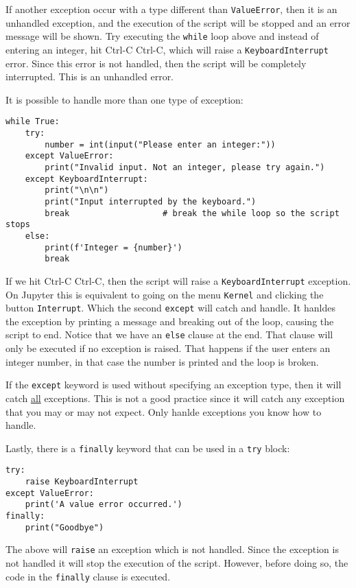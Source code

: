 \documentclass[12pt, a4paper]{article}
\begin{document}
If another exception occur with a type different than \texttt{ValueError}, then it is an unhandled exception, and the execution of the script will be stopped and an error message will be shown.
Try executing the \texttt{while} loop above and instead of entering an integer, hit Ctrl-C Ctrl-C, which will raise a \texttt{KeyboardInterrupt} error.
Since this error is not handled, then the script will be completely interrupted.
This is an unhandled error.

It is possible to handle more than one type of exception:
\lstset{language=jupyter-python,label= ,caption= ,captionpos=b,numbers=none}
\begin{lstlisting}
while True:
    try:
        number = int(input("Please enter an integer:"))
    except ValueError:
        print("Invalid input. Not an integer, please try again.")
    except KeyboardInterrupt:
        print("\n\n")
        print("Input interrupted by the keyboard.")
        break                   # break the while loop so the script stops
    else:
        print(f'Integer = {number}')
        break
\end{lstlisting}

If we hit Ctrl-C Ctrl-C, then the script will raise a \texttt{KeyboardInterrupt} exception.
On Jupyter this is equivalent to going on the menu \texttt{Kernel} and clicking the button \texttt{Interrupt}.
Which the second \texttt{except} will catch and handle.
It hanldes the exception by printing a message and breaking out of the loop, causing the script to end.
Notice that we have an \texttt{else} clause at the end.
That clause will only be executed if no exception is raised.
That happens if the user enters an integer number, in that case the number is printed and the loop is broken.

If the \texttt{except} keyword is used without specifying an exception type, then it will catch \uline{all} exceptions.
This is not a good practice since it will catch any exception that you may or may not expect.
Only hanlde exceptions you know how to handle.

Lastly, there is a \texttt{finally} keyword that can be used in a \texttt{try} block:
\lstset{language=jupyter-python,label= ,caption= ,captionpos=b,numbers=none}
\begin{lstlisting}
try:
    raise KeyboardInterrupt
except ValueError:
    print('A value error occurred.')
finally:
    print("Goodbye")
\end{lstlisting}

The above will \texttt{raise} an exception which is not handled.
Since the exception is not handled it will stop the execution of the script.
However, before doing so, the code in the \texttt{finally} clause is executed.
\end{document}
